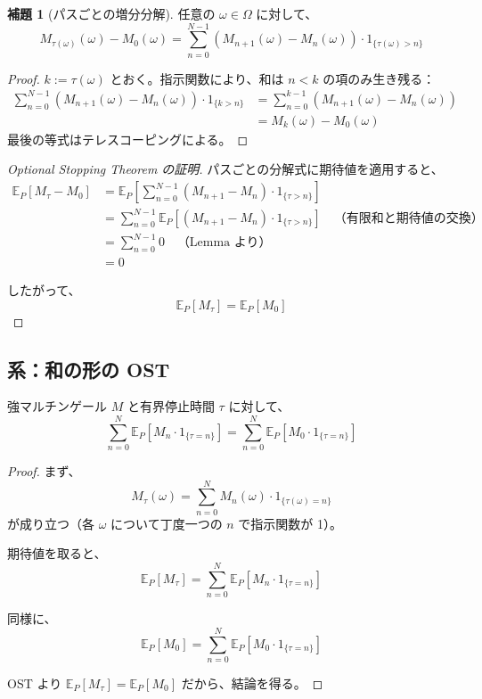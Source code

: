 \documentclass[a4paper,12pt]{ltjsarticle}
\theoremstyle{definition}
\newtheorem{lemma}[definition]{補題}
\begin{document}
\begin{lemma}[パスごとの増分分解]
任意の $\omega \in \Omega$ に対して、
\[
M_{\tau(\omega)}(\omega) - M_0(\omega) = \sum_{n=0}^{N-1} (M_{n+1}(\omega) - M_n(\omega)) \cdot 1_{\{\tau(\omega) > n\}}
\]
\end{lemma}

\begin{proof}
$k := \tau(\omega)$ とおく。指示関数により、和は $n < k$ の項のみ生き残る：
\begin{align*}
\sum_{n=0}^{N-1} (M_{n+1}(\omega) - M_n(\omega)) \cdot 1_{\{k > n\}}
&= \sum_{n=0}^{k-1} (M_{n+1}(\omega) - M_n(\omega)) \\
&= M_k(\omega) - M_0(\omega)
\end{align*}
最後の等式はテレスコーピングによる。
\end{proof}

\begin{proof}[Optional Stopping Theorem の証明]
パスごとの分解式に期待値を適用すると、
\begin{align*}
\mathbb{E}_P[M_\tau - M_0]
&= \mathbb{E}_P\left[\sum_{n=0}^{N-1} (M_{n+1} - M_n) \cdot 1_{\{\tau > n\}}\right] \\
&= \sum_{n=0}^{N-1} \mathbb{E}_P[(M_{n+1} - M_n) \cdot 1_{\{\tau > n\}}] \quad \text{（有限和と期待値の交換）} \\
&= \sum_{n=0}^{N-1} 0 \quad \text{（Lemma より）} \\
&= 0
\end{align*}

したがって、
\[
\mathbb{E}_P[M_\tau] = \mathbb{E}_P[M_0]
\]
\end{proof}

\subsection{系：和の形の OST}

\begin{corollary}
強マルチンゲール $M$ と有界停止時間 $\tau$ に対して、
\[
\sum_{n=0}^{N} \mathbb{E}_P[M_n \cdot 1_{\{\tau = n\}}] = \sum_{n=0}^{N} \mathbb{E}_P[M_0 \cdot 1_{\{\tau = n\}}]
\]
\end{corollary}

\begin{proof}
まず、
\[
M_\tau(\omega) = \sum_{n=0}^{N} M_n(\omega) \cdot 1_{\{\tau(\omega) = n\}}
\]
が成り立つ（各 $\omega$ について丁度一つの $n$ で指示関数が 1）。

期待値を取ると、
\[
\mathbb{E}_P[M_\tau] = \sum_{n=0}^{N} \mathbb{E}_P[M_n \cdot 1_{\{\tau = n\}}]
\]

同様に、
\[
\mathbb{E}_P[M_0] = \sum_{n=0}^{N} \mathbb{E}_P[M_0 \cdot 1_{\{\tau = n\}}]
\]

OST より $\mathbb{E}_P[M_\tau] = \mathbb{E}_P[M_0]$ だから、結論を得る。
\end{proof}
\end{document}
